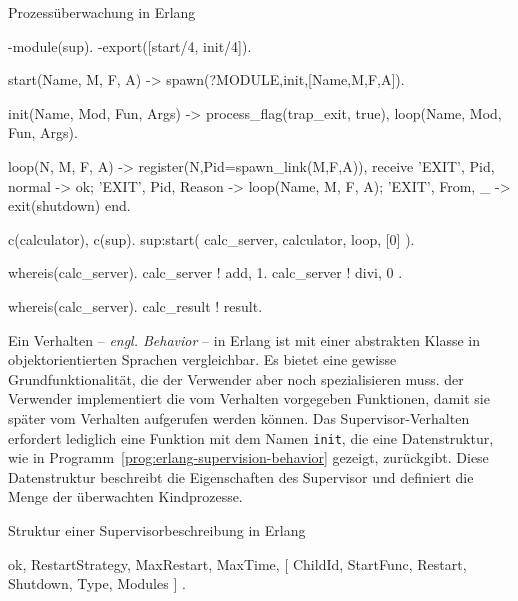 \begin{program}[!hbt]
\caption{Prozessüberwachung in Erlang}
\label{prog:erlang-supervision}
\noindent\begin{minipage}[t]{.52\textwidth}
\lstset{showlines=true}
\begin{ErlangCode}
-module(sup).
-export([start/4, init/4]).

start(Name, M, F, A) ->
  spawn(?MODULE,init,[Name,M,F,A]).

init(Name, Mod, Fun, Args) ->
  process_flag(trap_exit, true),
  loop(Name, Mod, Fun, Args).

loop(N, M, F, A) ->
  register(N,Pid=spawn_link(M,F,A)),
  receive
    { 'EXIT', Pid, normal } -> ok;
    { 'EXIT', Pid, Reason } -> 
      loop(Name, M, F, A);
    { 'EXIT', From, _ } -> 
			exit(shutdown)
  end.
\end{ErlangCode}

\end{minipage}\hfill
\begin{minipage}[t]{.44\textwidth}
\lstset{showlines=true}
\begin{ErlangCode}
c(calculator), c(sup).
sup:start(
  calc_server, 
  calculator, loop, [0]
).

whereis(calc_server).
calc_server ! {add, 1}.
calc_server ! { divi, 0 }.

whereis(calc_server). 
calc_result ! result.
\end{ErlangCode}

\end{minipage}
\end{program}

Ein Verhalten -- \textit{engl. Behavior} -- in Erlang ist mit einer abstrakten Klasse in objektorientierten Sprachen vergleichbar. Es bietet eine gewisse Grundfunktionalität, die der Verwender aber noch spezialisieren muss. \Dah der Verwender implementiert die vom Verhalten vorgegeben Funktionen, damit sie später vom Verhalten aufgerufen werden können. Das Supervisor-Verhalten erfordert lediglich eine Funktion mit dem Namen \lstinline{init}, die eine Datenstruktur, wie in Programm~\ref{prog:erlang-supervision-behavior} gezeigt, zurückgibt. Diese Datenstruktur beschreibt die Eigenschaften des Supervisor und definiert die Menge der überwachten Kindprozesse.

\begin{program}[!hbt]
\caption{Struktur einer Supervisorbeschreibung in Erlang}
\label{prog:erlang-supervision-behavior}
\begin{ErlangCode}
{ ok, 
  { {RestartStrategy, MaxRestart, MaxTime},
	  [ {ChildId, StartFunc, Restart, Shutdown, Type, Modules} ] } }.
\end{ErlangCode}
\end{program}

